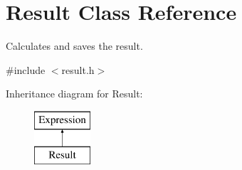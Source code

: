 \hypertarget{class_result}{}\section{Result Class Reference}
\label{class_result}


Calculates and saves the result.  




{\ttfamily \#include $<$result.\+h$>$}

Inheritance diagram for Result\+:\begin{figure}[H]
\begin{center}
\leavevmode
\includegraphics[height=2.000000cm]{class_result}
\end{center}
\end{figure}
